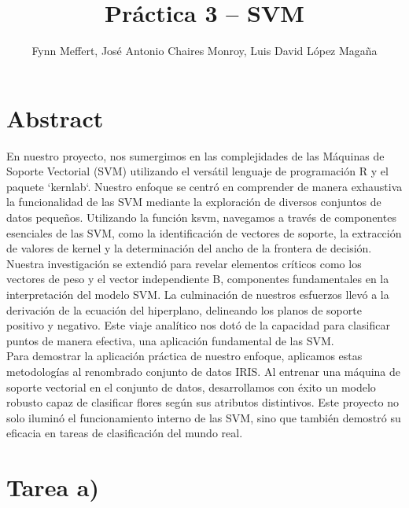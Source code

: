 \documentclass[fleqn]{llncs}
\begin{document}
\title{Práctica 3 -- SVM}

\author{Fynn Meffert, José Antonio Chaires Monroy, Luis David López Magaña}

\maketitle

\vspace{1cm} %

\section{Abstract}

En nuestro proyecto, nos sumergimos en las complejidades de las Máquinas de Soporte Vectorial (SVM) utilizando el versátil lenguaje de programación R y el paquete `kernlab`. Nuestro enfoque se centró en comprender de manera exhaustiva la funcionalidad de las SVM mediante la exploración de diversos conjuntos de datos pequeños. Utilizando la función ksvm, navegamos a través de componentes esenciales de las SVM, como la identificación de vectores de soporte, la extracción de valores de kernel y la determinación del ancho de la frontera de decisión.\\

Nuestra investigación se extendió para revelar elementos críticos como los vectores de peso y el vector independiente B, componentes fundamentales en la interpretación del modelo SVM. La culminación de nuestros esfuerzos llevó a la derivación de la ecuación del hiperplano, delineando los planos de soporte positivo y negativo. Este viaje analítico nos dotó de la capacidad para clasificar puntos de manera efectiva, una aplicación fundamental de las SVM.\\

Para demostrar la aplicación práctica de nuestro enfoque, aplicamos estas metodologías al renombrado conjunto de datos IRIS. Al entrenar una máquina de soporte vectorial en el conjunto de datos, desarrollamos con éxito un modelo robusto capaz de clasificar flores según sus atributos distintivos. Este proyecto no solo iluminó el funcionamiento interno de las SVM, sino que también demostró su eficacia en tareas de clasificación del mundo real.\\

\newpage

\section{Tarea a)}
\end{document}
